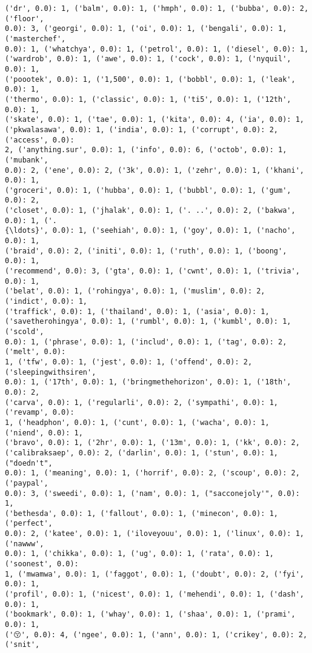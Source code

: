 \documentclass[11pt]{article}
\begin{document}
\begin{Verbatim}[commandchars=\\\{\}]
('dr', 0.0): 1, ('balm', 0.0): 1, ('hmph', 0.0): 1, ('bubba', 0.0): 2, ('floor',
0.0): 3, ('georgi', 0.0): 1, ('oi', 0.0): 1, ('bengali', 0.0): 1, ('masterchef',
0.0): 1, ('whatchya', 0.0): 1, ('petrol', 0.0): 1, ('diesel', 0.0): 1,
('wardrob', 0.0): 1, ('awe', 0.0): 1, ('cock', 0.0): 1, ('nyquil', 0.0): 1,
('poootek', 0.0): 1, ('1,500', 0.0): 1, ('bobbl', 0.0): 1, ('leak', 0.0): 1,
('thermo', 0.0): 1, ('classic', 0.0): 1, ('ti5', 0.0): 1, ('12th', 0.0): 1,
('skate', 0.0): 1, ('tae', 0.0): 1, ('kita', 0.0): 4, ('ia', 0.0): 1,
('pkwalasawa', 0.0): 1, ('india', 0.0): 1, ('corrupt', 0.0): 2, ('access', 0.0):
2, ('anything.sur', 0.0): 1, ('info', 0.0): 6, ('octob', 0.0): 1, ('mubank',
0.0): 2, ('ene', 0.0): 2, ('3k', 0.0): 1, ('zehr', 0.0): 1, ('khani', 0.0): 1,
('groceri', 0.0): 1, ('hubba', 0.0): 1, ('bubbl', 0.0): 1, ('gum', 0.0): 2,
('closet', 0.0): 1, ('jhalak', 0.0): 1, ('. ..', 0.0): 2, ('bakwa', 0.0): 1, ('.
{\ldots}', 0.0): 1, ('seehiah', 0.0): 1, ('goy', 0.0): 1, ('nacho', 0.0): 1,
('braid', 0.0): 2, ('initi', 0.0): 1, ('ruth', 0.0): 1, ('boong', 0.0): 1,
('recommend', 0.0): 3, ('gta', 0.0): 1, ('cwnt', 0.0): 1, ('trivia', 0.0): 1,
('belat', 0.0): 1, ('rohingya', 0.0): 1, ('muslim', 0.0): 2, ('indict', 0.0): 1,
('traffick', 0.0): 1, ('thailand', 0.0): 1, ('asia', 0.0): 1,
('savetherohingya', 0.0): 1, ('rumbl', 0.0): 1, ('kumbl', 0.0): 1, ('scold',
0.0): 1, ('phrase', 0.0): 1, ('includ', 0.0): 1, ('tag', 0.0): 2, ('melt', 0.0):
1, ('tfw', 0.0): 1, ('jest', 0.0): 1, ('offend', 0.0): 2, ('sleepingwithsiren',
0.0): 1, ('17th', 0.0): 1, ('bringmethehorizon', 0.0): 1, ('18th', 0.0): 2,
('carva', 0.0): 1, ('regularli', 0.0): 2, ('sympathi', 0.0): 1, ('revamp', 0.0):
1, ('headphon', 0.0): 1, ('cunt', 0.0): 1, ('wacha', 0.0): 1, ('niend', 0.0): 1,
('bravo', 0.0): 1, ('2hr', 0.0): 1, ('13m', 0.0): 1, ('kk', 0.0): 2,
('calibraksaep', 0.0): 2, ('darlin', 0.0): 1, ('stun', 0.0): 1, ("doedn't",
0.0): 1, ('meaning', 0.0): 1, ('horrif', 0.0): 2, ('scoup', 0.0): 2, ('paypal',
0.0): 3, ('sweedi', 0.0): 1, ('nam', 0.0): 1, ("sacconejoly'", 0.0): 1,
('bethesda', 0.0): 1, ('fallout', 0.0): 1, ('minecon', 0.0): 1, ('perfect',
0.0): 2, ('katee', 0.0): 1, ('iloveyouu', 0.0): 1, ('linux', 0.0): 1, ('nawww',
0.0): 1, ('chikka', 0.0): 1, ('ug', 0.0): 1, ('rata', 0.0): 1, ('soonest', 0.0):
1, ('mwamwa', 0.0): 1, ('faggot', 0.0): 1, ('doubt', 0.0): 2, ('fyi', 0.0): 1,
('profil', 0.0): 1, ('nicest', 0.0): 1, ('mehendi', 0.0): 1, ('dash', 0.0): 1,
('bookmark', 0.0): 1, ('whay', 0.0): 1, ('shaa', 0.0): 1, ('prami', 0.0): 1,
('😚', 0.0): 4, ('ngee', 0.0): 1, ('ann', 0.0): 1, ('crikey', 0.0): 2, ('snit',

\end{Verbatim}
\end{document}

